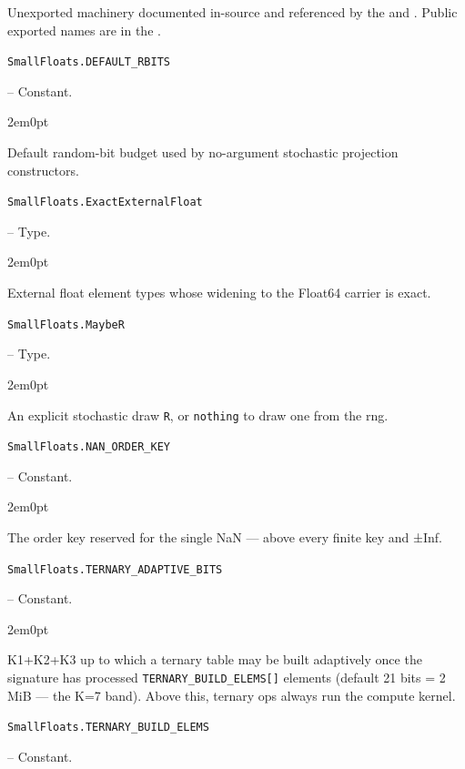 \label{2804742620609579687}{}


Unexported machinery documented in-source and referenced by the  and . Public exported names are in the .


\hypertarget{307234055475539643}{\texttt{SmallFloats.DEFAULT\_RBITS}}  -- {Constant.}

\begin{adjustwidth}{2em}{0pt}

Default random-bit budget used by no-argument stochastic projection constructors.



\end{adjustwidth}
\hypertarget{2700147405095606771}{\texttt{SmallFloats.ExactExternalFloat}}  -- {Type.}

\begin{adjustwidth}{2em}{0pt}

External float element types whose widening to the Float64 carrier is exact.



\end{adjustwidth}
\hypertarget{5600219088821016819}{\texttt{SmallFloats.MaybeR}}  -- {Type.}

\begin{adjustwidth}{2em}{0pt}

An explicit stochastic draw \texttt{R}, or \texttt{nothing} to draw one from the rng.



\end{adjustwidth}
\hypertarget{6952275749280347714}{\texttt{SmallFloats.NAN\_ORDER\_KEY}}  -- {Constant.}

\begin{adjustwidth}{2em}{0pt}

The order key reserved for the single NaN — above every finite key and ±Inf.



\end{adjustwidth}
\hypertarget{364714985955516448}{\texttt{SmallFloats.TERNARY\_ADAPTIVE\_BITS}}  -- {Constant.}

\begin{adjustwidth}{2em}{0pt}

K1+K2+K3 up to which a ternary table may be built adaptively once the signature has processed \texttt{TERNARY\_BUILD\_ELEMS[]} elements (default 21 bits = 2 MiB — the K=7 band). Above this, ternary ops always run the compute kernel.



\end{adjustwidth}
\hypertarget{3202729790529991172}{\texttt{SmallFloats.TERNARY\_BUILD\_ELEMS}}  -- {Constant.}

